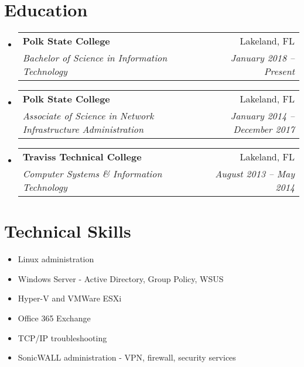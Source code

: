 \documentclass[letterpaper,11pt]{article}
\makeatletter
\newcommand{\resumeItem}[2]{
  \item\small{
    \textbf{}{#2 \vspace{-2pt}}
  }
}
\newcommand{\resumeSubheading}[4]{
  \vspace{-1pt}\item
    \begin{tabular*}{0.97\textwidth}{l@{\extracolsep{\fill}}r}
      \textbf{#1} & #2 \\
      \textit{\small#3} & \textit{\small #4} \\
    \end{tabular*}\vspace{-5pt}
}
\newcommand{\resumeSubItem}[2]{\resumeItem{#1}{#2}\vspace{-4pt}}
\newcommand{\resumeSubHeadingListStart}{\begin{itemize}[leftmargin=*]}
\newcommand{\resumeSubHeadingListEnd}{\end{itemize}}
\makeatother
\begin{document}
\section{Education}
  \resumeSubHeadingListStart
    \resumeSubheading
      {Polk State College}{Lakeland, FL}
      {Bachelor of Science in Information Technology}{January 2018 -- Present}
    \resumeSubheading
      {Polk State College}{Lakeland, FL}
      {Associate of Science in Network Infrastructure Administration}{January 2014 -- December 2017}
    \resumeSubheading
      {Traviss Technical College}{Lakeland, FL}
      {Computer Systems \& Information Technology}{August 2013 -- May 2014}
  \resumeSubHeadingListEnd

\section{Technical Skills}
  \resumeSubHeadingListStart
    \resumeSubItem{}
      {Linux administration}
    \resumeSubItem{}
      {Windows Server - Active Directory, Group Policy, WSUS}
    \resumeSubItem{}
      {Hyper-V and VMWare ESXi}
    \resumeSubItem{}
      {Office 365 Exchange}
    \resumeSubItem{}
      {TCP/IP troubleshooting}
    \resumeSubItem{}
      {SonicWALL administration - VPN, firewall, security services}
  \resumeSubHeadingListEnd
\end{document}
